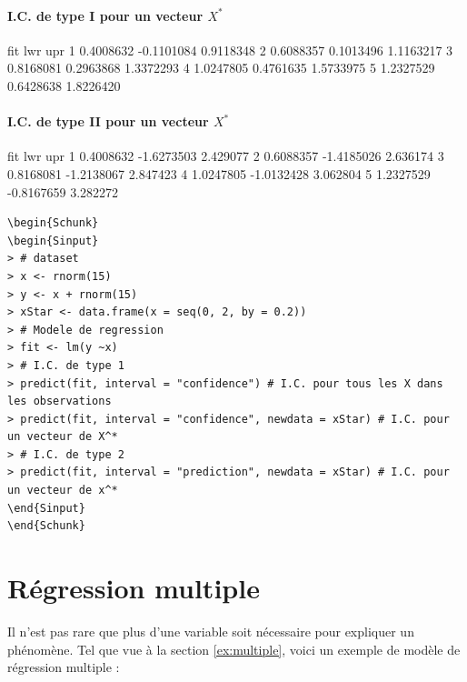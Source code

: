 \documentclass[11pt,french]{report}
\begin{document}
\subsubsection*{I.C. de type I pour un vecteur $X^*$}
\begin{Schunk}
\begin{Soutput}
        fit        lwr       upr
1 0.4008632 -0.1101084 0.9118348
2 0.6088357  0.1013496 1.1163217
3 0.8168081  0.2963868 1.3372293
4 1.0247805  0.4761635 1.5733975
5 1.2327529  0.6428638 1.8226420
\end{Soutput}
\end{Schunk}

\subsubsection*{I.C. de type II pour un vecteur $X^*$}
\begin{Schunk}
\begin{Soutput}
        fit        lwr      upr
1 0.4008632 -1.6273503 2.429077
2 0.6088357 -1.4185026 2.636174
3 0.8168081 -1.2138067 2.847423
4 1.0247805 -1.0132428 3.062804
5 1.2327529 -0.8167659 3.282272
\end{Soutput}
\end{Schunk}

\begin{lstlisting}[linerange=\\begin\{Sinput\}-\\end\{Sinput\},includerangemarker=false, caption = Code source en R pour l'exemple]
\begin{Schunk}
\begin{Sinput}
> # dataset
> x <- rnorm(15)
> y <- x + rnorm(15)
> xStar <- data.frame(x = seq(0, 2, by = 0.2)) 
> # Modele de regression
> fit <- lm(y ~x)
> # I.C. de type 1
> predict(fit, interval = "confidence") # I.C. pour tous les X dans les observations
> predict(fit, interval = "confidence", newdata = xStar) # I.C. pour un vecteur de X^*
> # I.C. de type 2
> predict(fit, interval = "prediction", newdata = xStar) # I.C. pour un vecteur de x^*
\end{Sinput}
\end{Schunk}
\end{lstlisting}
\bigskip

\chapter{Régression multiple}
Il n'est pas rare que plus d'une variable soit nécessaire pour expliquer un phénomène. 
Tel que vue à la section \ref{ex:multiple}, voici un exemple de modèle de régression multiple :
\end{document}
